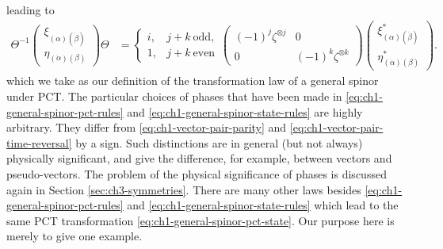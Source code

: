 leading to
\begin{equation}
\begin{aligned}
  \Theta^{-1}
  \begin{pmatrix}
    \xi_{(\alpha)(\dot\beta)}\\
    \eta_{(\dot\alpha)(\beta)}
  \end{pmatrix}
  \Theta
  &=
  \begin{cases}
    i,&j+k\ \text{odd},\\
    1,&j+k\ \text{even}
  \end{cases}
  \begin{pmatrix}
    (-1)^j\zeta^{\otimes j}&0\\
    0&(-1)^k\zeta^{\otimes k}
  \end{pmatrix}
  \begin{pmatrix}
    \xi_{(\alpha)(\dot\beta)}^*\\
    \eta_{(\dot\alpha)(\beta)}^*
  \end{pmatrix} .
\end{aligned}
\tag{1-53}\label{eq:ch1-general-spinor-pct-state}
\end{equation}
which we take as our definition of the transformation law of a general spinor
under PCT. The particular choices of phases that have been made in \eqref{eq:ch1-general-spinor-pct-rules} and
\eqref{eq:ch1-general-spinor-state-rules} are highly arbitrary. They differ from \eqref{eq:ch1-vector-pair-parity} and \eqref{eq:ch1-vector-pair-time-reversal} by a sign.
Such distinctions are in general (but not always) physically significant, and
give the difference, for example, between vectors and pseudo-vectors. The
problem of the physical significance of phases is discussed again in Section
\ref{sec:ch3-symmetries}. There are many other laws besides
\eqref{eq:ch1-general-spinor-pct-rules} and
\eqref{eq:ch1-general-spinor-state-rules} which lead to the same PCT
transformation \eqref{eq:ch1-general-spinor-pct-state}. Our purpose here is merely to give one example.
